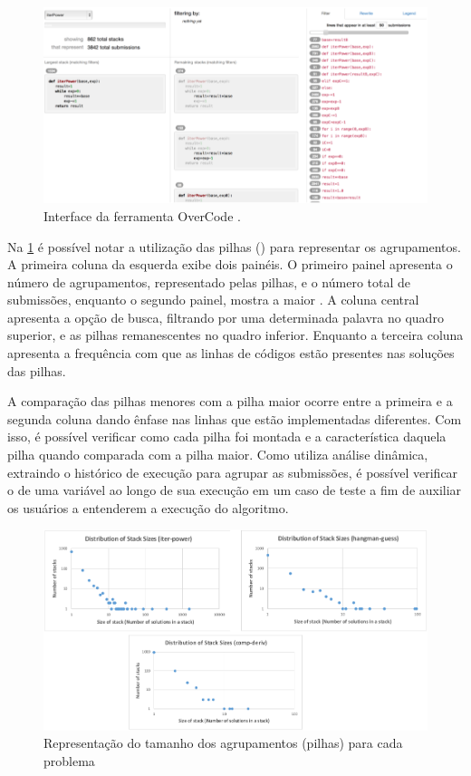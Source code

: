 	    \begin{figure}[ht]
	        \centering
	        \includegraphics[scale=0.4]{imagem/overCode.png}
	        \captionsetup{justification=centering}
	        \caption[Interface da ferramenta OverCode.]{Interface da ferramenta OverCode \cite{Glassman:2015}.}
	        \label{fig:interfaceOverCode}
	    \end{figure}
	    
		Na \cref{fig:interfaceOverCode} é possível notar a utilização das pilhas
		() para representar os agrupamentos. A primeira coluna da
		esquerda exibe dois painéis. O primeiro painel apresenta o número de
		agrupamentos, representado pelas pilhas, e o número total de submissões,
		enquanto o segundo painel, mostra a maior . A coluna central
		apresenta a opção de busca, filtrando por uma determinada palavra no quadro
		superior, e as pilhas remanescentes no quadro inferior. Enquanto a terceira
		coluna apresenta a frequência com que as linhas de códigos estão presentes
		nas soluções das pilhas.

		A comparação das pilhas menores com a pilha maior ocorre entre a primeira e a
	    segunda coluna dando ênfase nas linhas que estão implementadas diferentes. Com
	    isso, é possível verificar como cada pilha foi montada e a característica daquela
	    pilha quando comparada com a pilha maior. Como utiliza análise dinâmica, extraindo
	    o histórico de execução para agrupar as submissões, é possível verificar o 
	    de uma variável ao longo de sua execução em um caso de teste a fim de auxiliar os
	    usuários a entenderem a execução do algoritmo.
	    
		\begin{figure}[h]
			\centering
			\includegraphics[width=0.7\linewidth]{imagem/OverCodeDistri}
			\caption[Representação do tamanho dos agrupamentos (pilhas) para cada problema]{Representação do tamanho dos agrupamentos (pilhas) para cada problema \cite{Glassman:2015}}
			\label{fig:OverCodeDistri}
		\end{figure}

